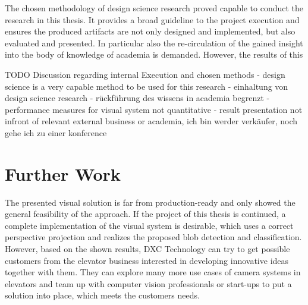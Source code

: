 The chosen methodology of design science research proved capable to 
conduct the research in this thesis.
It provides a broad guideline to the project execution 
and ensures the produced artifacts are not only designed and implemented, but also evaluated and presented.
In particular also the re-circulation of the gained insight into the body of knowledge of academia is demanded.
However, the results of this 


TODO  Discussion regarding internal Execution and chosen methods 
- design science is a very capable method to be used for this research
- einhaltung von design science research - rückführung des wissens in academia begrenzt
- performance measures for visual system not quantitative
- result presentation not infront of relevant external business or academia, ich bin werder verkäufer, noch gehe ich zu einer konference

\section{Further Work}

The presented visual solution is far from production-ready and only showed the general feasibility of the approach.
If the project of this thesis is continued, a complete implementation of the visual system is desirable, which uses a correct perspective projection and realizes the proposed blob detection and classification.
However, based on the shown results, DXC Technology can try to get possible customers from the elevator business interested in developing innovative ideas together with them.
They can explore many more use cases of camera systems in elevators and team up with computer vision professionals or start-ups to put a solution into place, which meets the customers needs.
